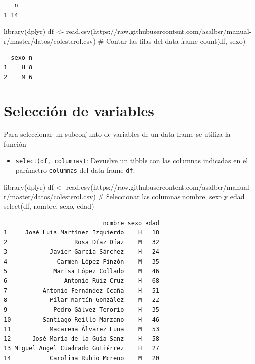 \documentclass[
  a4paper,
]{scrreport}
\newenvironment{Shaded}{\begin{snugshade}}{\end{snugshade}}
\newcommand{\CommentTok}[1]{\textcolor[rgb]{0.37,0.37,0.37}{#1}}
\newcommand{\FunctionTok}[1]{\textcolor[rgb]{0.28,0.35,0.67}{#1}}
\newcommand{\NormalTok}[1]{\textcolor[rgb]{0.00,0.23,0.31}{#1}}
\newcommand{\OtherTok}[1]{\textcolor[rgb]{0.00,0.23,0.31}{#1}}
\newcommand{\StringTok}[1]{\textcolor[rgb]{0.13,0.47,0.30}{#1}}
\providecommand{\tightlist}{%
  \setlength{\itemsep}{0pt}\setlength{\parskip}{0pt}}\usepackage{longtable,booktabs,array}
\theoremstyle{definition}
\theoremstyle{definition}
\theoremstyle{remark}
\begin{document}
\begin{verbatim}
   n
1 14
\end{verbatim}

\begin{Shaded}
\begin{Highlighting}[]
\FunctionTok{library}\NormalTok{(dplyr)}
\NormalTok{df }\OtherTok{\textless{}{-}} \FunctionTok{read.csv}\NormalTok{(}\StringTok{\textquotesingle{}https://raw.githubusercontent.com/asalber/manual{-}r/master/datos/colesterol.csv\textquotesingle{}}\NormalTok{)}
\CommentTok{\# Contar las filas del data frame}
\FunctionTok{count}\NormalTok{(df, sexo)}
\end{Highlighting}
\end{Shaded}

\begin{verbatim}
  sexo n
1    H 8
2    M 6
\end{verbatim}

\hypertarget{selecciuxf3n-de-variables}{%
\section{Selección de variables}\label{selecciuxf3n-de-variables}}

Para seleccionar un subconjunto de variables de un data frame se utiliza
la función

\begin{itemize}
\tightlist
\item
  \texttt{select(df,\ columnas)}: Devuelve un tibble con las columnas
  indicadas en el parámetro \texttt{columnas} del data frame
  \texttt{df}.
\end{itemize}

\begin{Shaded}
\begin{Highlighting}[]
\FunctionTok{library}\NormalTok{(dplyr)}
\NormalTok{df }\OtherTok{\textless{}{-}} \FunctionTok{read.csv}\NormalTok{(}\StringTok{\textquotesingle{}https://raw.githubusercontent.com/asalber/manual{-}r/master/datos/colesterol.csv\textquotesingle{}}\NormalTok{)}
\CommentTok{\# Seleccionar las columnas nombre, sexo y edad}
\FunctionTok{select}\NormalTok{(df, nombre, sexo, edad)}
\end{Highlighting}
\end{Shaded}

\begin{verbatim}
                            nombre sexo edad
1     José Luis Martínez Izquierdo    H   18
2                   Rosa Díaz Díaz    M   32
3            Javier García Sánchez    H   24
4              Carmen López Pinzón    M   35
5             Marisa López Collado    M   46
6                Antonio Ruiz Cruz    H   68
7          Antonio Fernández Ocaña    H   51
8            Pilar Martín González    M   22
9             Pedro Gálvez Tenorio    H   35
10         Santiago Reillo Manzano    H   46
11           Macarena Álvarez Luna    M   53
12      José María de la Guía Sanz    H   58
13 Miguel Angel Cuadrado Gutiérrez    H   27
14           Carolina Rubio Moreno    M   20
\end{verbatim}
\end{document}
